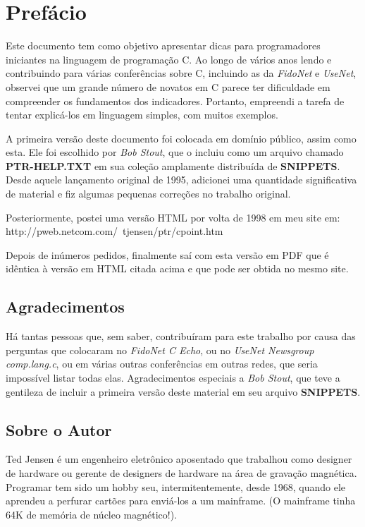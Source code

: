 
\chapter*{Prefácio}

Este documento tem como objetivo apresentar dicas para programadores iniciantes na linguagem de programação C. Ao longo de vários anos lendo e contribuindo para várias conferências sobre C, incluindo as da \textit{FidoNet} e \textit{UseNet}, observei que um grande número de novatos em C parece ter dificuldade em compreender os fundamentos dos indicadores. Portanto, empreendi a tarefa de tentar explicá-los em linguagem simples, com muitos exemplos.

A primeira versão deste documento foi colocada em domínio público, assim como esta. Ele foi escolhido por \textit{Bob Stout}, que o incluiu como um arquivo chamado \textbf{PTR-HELP.TXT} em sua coleção amplamente distribuída de \textbf{SNIPPETS}. Desde aquele lançamento original de 1995, adicionei uma quantidade significativa de material e fiz algumas pequenas correções no trabalho original.

Posteriormente, postei uma versão HTML por volta de 1998 em meu site em:\\
http://pweb.netcom.com/~tjensen/ptr/cpoint.htm

Depois de inúmeros pedidos, finalmente saí com esta versão em PDF que é idêntica à versão em HTML citada acima e que pode ser obtida no mesmo site.

\section*{Agradecimentos}
Há tantas pessoas que, sem saber, contribuíram para este trabalho por causa das perguntas que colocaram no \textit{FidoNet C Echo}, ou no \textit{UseNet Newsgroup comp.lang.c}, ou em várias outras conferências em outras redes, que seria impossível listar todas elas. Agradecimentos especiais a \textit{Bob Stout}, que teve a gentileza de incluir a primeira versão deste material em seu arquivo \textbf{SNIPPETS}.

\section*{Sobre o Autor}
Ted Jensen é um engenheiro eletrônico aposentado que trabalhou como designer de hardware ou gerente de designers de hardware na área de gravação magnética. Programar tem sido um hobby seu, intermitentemente, desde 1968, quando ele aprendeu a perfurar cartões para enviá-los a um mainframe. (O mainframe tinha 64K de memória de núcleo magnético!).

